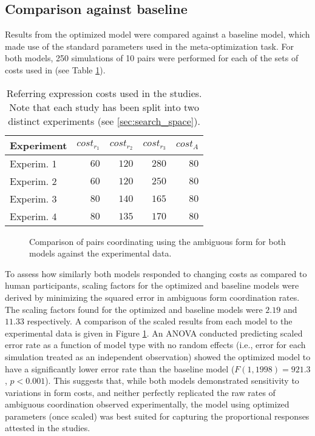 \documentclass[11pt]{article}
\begin{document}
\subsection{Comparison against baseline}
\label{sec:model_comparison}
Results from the optimized model were compared against a baseline model, which made use of the standard parameters used in the meta-optimization task. For both models, 250 simulations of 10 pairs were performed for each of the sets of costs used in \citeauthor{rohde2012} (see Table \ref{table:2}).
\begin{table}[]
\begin{center}
    \begin{tabular}{ l r r r r }
    Experiment & $cost_{r_1}$ & $cost_{r_2}$ & $cost_{r_3}$ & $cost_A$\\ \hline
    Experim. 1 & $60$ & $120$ & $280$ & $80$ \\ \hline
    Experim. 2 & $60$ & $120$ & $250$ & $80$ \\ \hline
    Experim. 3 & $80$ & $140$ & $165$ & $80$ \\ \hline
    Experim. 4 & $80$ & $135$ & $170$ & $80$ \\ 
    \end{tabular}
    \caption{Referring expression costs used in the \citeauthor{rohde2012} studies. Note that each study has 	    been split into two distinct experiments (see \ref{sec:search_space}).}
    \label{table:2}
\end{center}
\end{table}

\begin{figure}
\centering
\scalebox{.55}{}
\caption{Comparison of pairs coordinating using the ambiguous form for both models against the experimental data.}
\label{fig:model_comp}
\end{figure}

To assess how similarly both models responded to changing costs as compared to human participants, scaling factors for the optimized and baseline models were derived by minimizing the squared error in ambiguous form coordination rates. The scaling factors found for the optimized and baseline models were $2.19$ and $11.33$ respectively. A comparison of the scaled results from each model to the experimental data is given in Figure \ref{fig:model_comp}. An ANOVA conducted predicting scaled error rate as a function of model type with no random effects (i.e., error for each simulation treated as an independent observation) showed the optimized model to have a significantly lower error rate than the baseline model ($F(1, 1998) = 921.3$, $p<0.001$). This suggests that, while both models demonstrated sensitivity to variations in form costs, and neither perfectly replicated the raw rates of ambiguous coordination observed experimentally, the model using  optimized parameters (once scaled) was best suited for capturing the proportional responses attested in the \cite{rohde2012} studies. 
\end{document}

